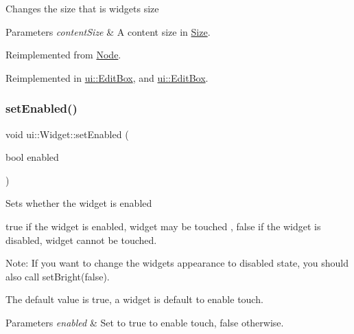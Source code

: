 Changes the size that is widget\textquotesingle{}s size 
\begin{DoxyParams}{Parameters}
{\em content\+Size} & A content size in {\ttfamily \hyperlink{classSize}{Size}}. \\
\hline
\end{DoxyParams}


Reimplemented from \hyperlink{classNode_ade113d7fc9244f58ac98a4712da49818}{Node}.



Reimplemented in \hyperlink{classui_1_1EditBox_a3fbf590dff29ba873d9c72af308f7edd}{ui\+::\+Edit\+Box}, and \hyperlink{classui_1_1EditBox_a1aadf938d146d0469da42e42d33e2a1e}{ui\+::\+Edit\+Box}.

\mbox{\label{classui_1_1Widget_a53b38b17228173b7ba8fe5f141a20bb8}} 
\subsubsection{\texorpdfstring{set\+Enabled()}{setEnabled()}\hspace{0.1cm}{\footnotesize\ttfamily [1/2]}}
{\footnotesize\ttfamily void ui\+::\+Widget\+::set\+Enabled (\begin{DoxyParamCaption}\item[{bool}]{enabled }\end{DoxyParamCaption})\hspace{0.3cm}{\ttfamily [virtual]}}

Sets whether the widget is enabled

true if the widget is enabled, widget may be touched , false if the widget is disabled, widget cannot be touched.

Note\+: If you want to change the widget\textquotesingle{}s appearance to disabled state, you should also call {\ttfamily set\+Bright(false)}.

The default value is true, a widget is default to enable touch.


\begin{DoxyParams}{Parameters}
{\em enabled} & Set to true to enable touch, false otherwise. \\
\hline
\end{DoxyParams}
\mbox{\label{classui_1_1Widget_a0d06681b8d0275c0e52e887c8bf2a8c6}} 
